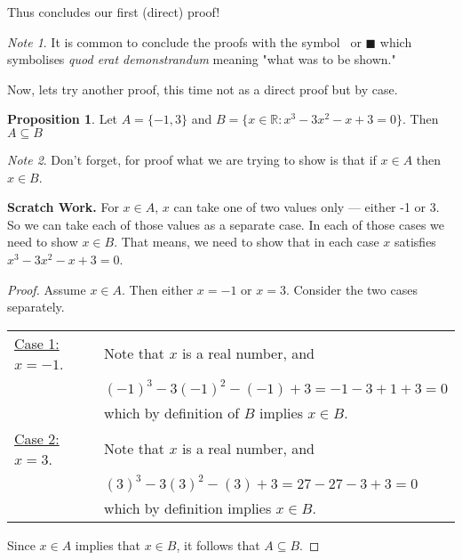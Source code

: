 \documentclass{amsart} %
\theoremstyle{definition} %
\theoremstyle{proposition} %
\newtheorem*{prpn}{Proposition}
\theoremstyle{remark} %
\newtheorem*{note}{Note}
\begin{document}
Thus concludes our first (direct) proof!

\begin{note}
It is common to conclude the proofs with the symbol \qedsymbol\ or $\blacksquare$ which symbolises \emph{quod erat demonstrandum} meaning "what was to be shown."
\end{note}

\bigskip
\bigskip

Now, lets try another proof, this time not as a direct proof but by case.

\begin{prpn}
Let $A = \{-1,3\}$ and $B = \{x \in \mathbb{R}: x^3 - 3x^2 - x + 3 = 0  \} $. Then $A \subseteq B$
\end{prpn}

\begin{note}
Don't forget, for proof what we are trying to show is that if $x \in A$ then $x \in B$.
\end{note}

\noindent \textbf{Scratch Work.} For $x \in A$, $x$ can take one of two values only --- either -1 or 3. So we can take each of those values as a separate case. In each of those cases we need to show $x \in B$. That means, we need to show that in each case $x$ satisfies $x^3 - 3x^2 - x + 3 = 0$.

\begin{proof}
      Assume $x \in A$. Then either $x = -1$ or $x = 3$. Consider the two cases separately. \\
    \begin{center}
      \begin{tabular}{l l}
            \underline{Case 1: $x = -1$}. & Note that $x$ is a real number, and \\
            & $(-1)^3 - 3(-1)^2 - (-1) + 3 = -1 - 3 + 1 + 3 = 0$ \\
            & which by definition of $B$ implies $x \in B$. \\

            \underline{Case 2: $x = 3$}. & Note that $x$ is a real number, and \\
            & $(3)^3 - 3(3)^2 - (3) + 3 = 27 - 27 - 3 + 3 = 0$ \\
            & which by definition implies $x \in B$.
      \end{tabular}
    \end{center}
      Since $x \in A$ implies that $x \in B$, it follows that $A \subseteq B$.
\end{proof}
\end{document}
